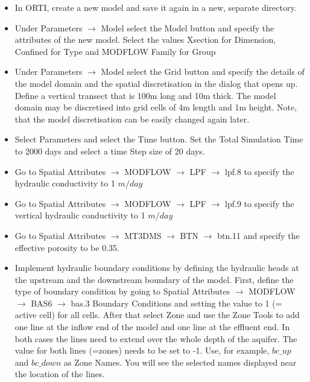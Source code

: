 \begin{itemize}

\item In ORTI, create a new model and save it again in a new, separate directory.

\item Under {\color{blue}Parameters} $\rightarrow$ {\color{blue}Model} select the {\color{blue}Model} button and specify the attributes of the new model. Select the values {\color{blue}Xsection} for {\color{blue}Dimension}, {\color{blue}Confined} for {\color{blue}Type} 
and {\color{blue}MODFLOW Family} for {\color{blue}Group} 

\item Under {\color{blue}Parameters} $\rightarrow$ {\color{blue}Model} select the {\color{blue}Grid} button and specify the details of the model domain and the spatial discretisation in the dialog that opens up. Define a vertical transect that is 100m long and 10m thick. The model domain
may be discretised into grid cells of 4m length and 1m height. Note, that the 
model discretisation can be easily changed again later. 

\item Select {\color{blue}Parameters} and select the {\color{blue}Time} button.
Set the {\color{blue}Total Simulation Time} to 2000 days and select a time {\color{blue}Step size}
of 20 days. 

\item Go to {\color{blue}Spatial Attributes} $\rightarrow$ {\color{blue}MODFLOW} $\rightarrow$ {\color{blue}LPF} $\rightarrow$ {\color{blue}lpf.8} to specify the hydraulic conductivity to 1 $m/day$

\item Go to {\color{blue}Spatial Attributes} $\rightarrow$ {\color{blue}MODFLOW} $\rightarrow$ {\color{blue}LPF} $\rightarrow$ {\color{blue}lpf.9} to specify the vertical hydraulic conductivity to 1 $m/day$

\item Go to {\color{blue}Spatial Attributes} $\rightarrow$ {\color{blue}MT3DMS} $\rightarrow$ {\color{blue}BTN} $\rightarrow$ {\color{blue}btn.11} and specify the effective porosity to be 0.35.


\item Implement hydraulic boundary conditions by defining the hydraulic heads at the upstream and the downstream boundary of the model. First, define the type of boundary condition by going to {\color{blue}Spatial Attributes} $\rightarrow$ {\color{blue}MODFLOW} $\rightarrow$ {\color{blue}BAS6} $\rightarrow$ {\color{blue}bas.3 Boundary Conditions} and setting the value to 1 (= active cell) for all cells. After that select {\color{blue}Zone} and use the {\color{blue}Zone Tools} to add one line at the inflow end of the model and one line at the effluent end. 
In both cases the lines need to extend over the whole depth of the aquifer. 
The value for both lines (=zones) needs to be set to -1. Use, for example,
$bc\_up$ and $bc\_down$ as {\color{blue}Zone Names}. You will see the selected names displayed near 
the location of the lines.
  

\end{itemize}
